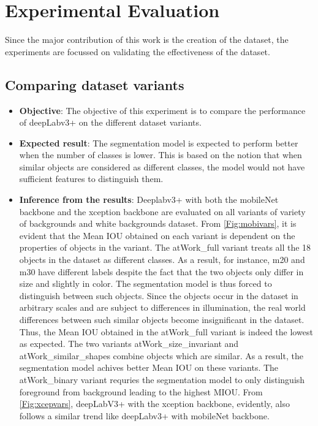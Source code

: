 
\chapter{Experimental Evaluation}

Since the major contribution of this work is the creation of the dataset, the experiments are focussed on validating the effectiveness of the dataset. 


\section{Comparing dataset variants} 

	\begin{itemize}
		\item \textbf{Objective}: The objective of this experiment is to compare the performance of deepLabv3+ on the different dataset variants.
		\item \textbf{Expected result}: The segmentation model is expected to perform better when the number of classes is lower. This is based on the notion that when similar objects are considered as different classes, the model would not have sufficient features to distinguish them.
		\item \textbf{Inference from the results}: Deeplabv3+ with both the mobileNet backbone and the xception backbone are evaluated on all variants of variety of backgrounds and white backgrounds dataset. From \ref{Fig:mobivars}, it is evident that the Mean IOU obtained on each variant is dependent on the properties of objects in the variant. The atWork\_full variant treats all the 18 objects in the dataset as different classes. As a result, for instance, m20 and m30 have different labels despite the fact that the two objects only differ in size and slightly in color. The segmentation model is thus forced to distinguish between such objects. Since the objects occur in the dataset in arbitrary scales and are subject to differences in illumination, the real world differences between such similar objects become insignificant in the dataset. Thus, the Mean IOU obtained in the atWork\_full variant is indeed the lowest as expected. The two variants atWork\_size\_invariant and atWork\_similar\_shapes combine objects which are similar. As a result, the segmentation model achives better Mean IOU on these variants. The atWork\_binary variant requries the segmentation model to only distinguish foreground from background leading to the highest MIOU. From \ref{Fig:xcepvars}, deepLabV3+ with the xception backbone, evidently, also follows a similar trend like deepLabv3+ with mobileNet backbone.
	\end{itemize}

